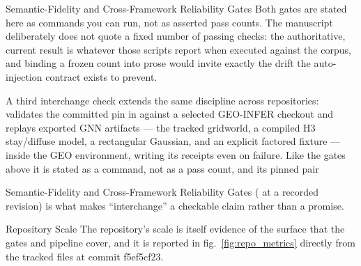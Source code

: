 \documentclass[
  ignorenonframetext,
]{beamer}
\begin{document}
\begin{frame}{Semantic-Fidelity and
Cross-Framework Reliability Gates}
Both gates are stated here as commands you can run, not as asserted pass
counts. The manuscript deliberately does not quote a fixed number of
passing checks: the authoritative, current result is whatever those
scripts report when executed against the corpus, and binding a frozen
count into prose would invite exactly the drift the auto-injection
contract exists to prevent.

A third interchange check extends the same discipline across
repositories: 
validates the committed pin in  against a
selected GEO-INFER checkout and replays exported GNN artifacts --- the
tracked gridworld, a compiled H3 stay/diffuse model, a rectangular
Gaussian, and an explicit factored fixture --- inside the GEO
environment, writing its receipts even on failure. Like the gates above
it is stated as a command, not as a pass count, and its pinned pair
\end{frame}

\begin{frame}{Semantic-Fidelity and
Cross-Framework Reliability Gates}
( at a recorded revision) is
what makes ``interchange'' a checkable claim rather than a promise.
\end{frame}

\begin{frame}{Repository Scale}
\protect{}\label{repository-scale}
The repository's scale is itself evidence of the surface that the gates
and pipeline cover, and it is reported in fig.~\ref{fig:repo_metrics}
directly from the tracked files at commit f5ef5cf23.

\end{frame}
\end{document}
